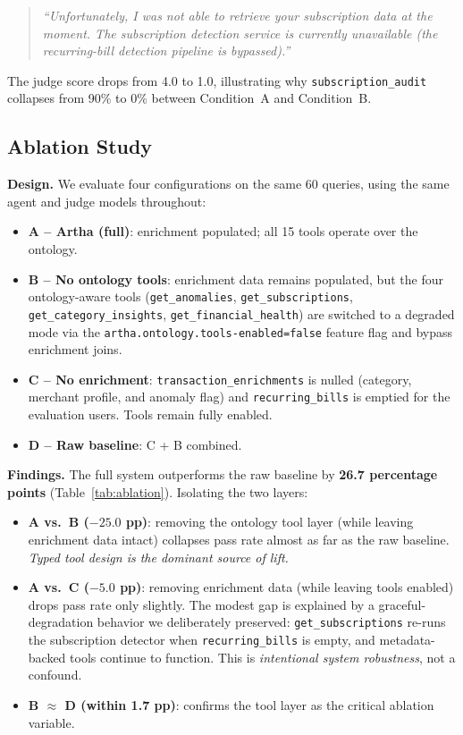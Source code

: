 \documentclass[conference]{IEEEtran}
\begin{document}
\begin{quote}\small\itshape
``Unfortunately, I was not able to retrieve your subscription data
at the moment. The subscription detection service is currently
unavailable (the recurring-bill detection pipeline is bypassed).''
\end{quote}

The judge score drops from 4.0 to 1.0, illustrating why
\texttt{subscription\_audit} collapses from 90\% to 0\% between
Condition~A and Condition~B.

\subsection{Ablation Study}
\label{sec:ablation}

\textbf{Design.} We evaluate four configurations on the same 60
queries, using the same agent and judge models throughout:

\begin{itemize}
  \item \textbf{A -- Artha (full)}: enrichment populated; all 15
    tools operate over the ontology.
  \item \textbf{B -- No ontology tools}: enrichment data remains
    populated, but the four ontology-aware tools
    (\texttt{get\_anomalies}, \texttt{get\_subscriptions},
    \texttt{get\_category\_insights},
    \texttt{get\_financial\_health}) are switched to a degraded
    mode via the \texttt{artha.ontology.tools-enabled=false}
    feature flag and bypass enrichment joins.
  \item \textbf{C -- No enrichment}: \texttt{transaction\_enrichments}
    is nulled (category, merchant profile, and anomaly flag) and
    \texttt{recurring\_bills} is emptied for the evaluation users.
    Tools remain fully enabled.
  \item \textbf{D -- Raw baseline}: C + B combined.
\end{itemize}

\textbf{Findings.} The full system outperforms the raw baseline
by \textbf{26.7 percentage points} (Table~\ref{tab:ablation}).
Isolating the two layers:

\begin{itemize}
  \item \textbf{A vs.\ B ($-25.0$ pp)}: removing the ontology tool
    layer (while leaving enrichment data intact) collapses pass
    rate almost as far as the raw baseline. \emph{Typed tool design
    is the dominant source of lift.}
  \item \textbf{A vs.\ C ($-5.0$ pp)}: removing enrichment data
    (while leaving tools enabled) drops pass rate only slightly.
    The modest gap is explained by a graceful-degradation behavior
    we deliberately preserved: \texttt{get\_subscriptions} re-runs
    the subscription detector when \texttt{recurring\_bills} is
    empty, and metadata-backed tools continue to function. This is
    \emph{intentional system robustness}, not a confound.
  \item \textbf{B $\approx$ D (within 1.7 pp)}: confirms the tool
    layer as the critical ablation variable.
\end{itemize}
\end{document}
